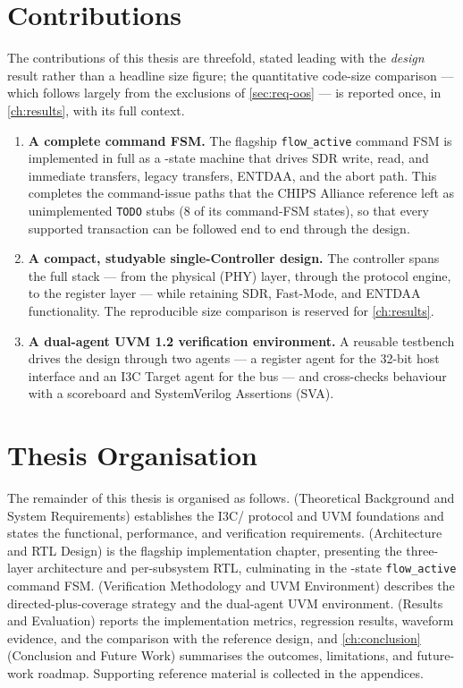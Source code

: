 \section{Contributions}
\label{sec:intro-contrib}

The contributions of this thesis are threefold, stated leading with the \emph{design} result rather than
a headline size figure; the quantitative code-size comparison --- which follows largely from the exclusions
of \cref{sec:req-oos} --- is reported once, in \cref{ch:results}, with its full context.

\begin{enumerate}
  \item \textbf{A complete command FSM.} The flagship \texttt{flow_active} command FSM is implemented in
  full as a \FlowStateCount-state machine that drives SDR write, read, and immediate transfers, \iic{} legacy
  transfers, ENTDAA, and the abort path. This completes the command-issue paths that the
  CHIPS Alliance reference left as unimplemented \texttt{TODO} stubs (8 of its command-FSM states), so
  that every supported transaction can be followed end to end through the design.

  \item \textbf{A compact, studyable single-Controller design.} The controller spans the full stack ---
  from the physical (PHY) layer, through the protocol engine, to the register layer --- while retaining
  SDR, \iic{} Fast-Mode, and ENTDAA functionality. The reproducible size comparison is reserved for
  \cref{ch:results}.

  \item \textbf{A dual-agent UVM 1.2 verification environment.} A reusable testbench drives the design
  through two agents --- a register agent for the 32-bit host interface and an I3C Target agent for the
  bus --- and cross-checks behaviour with a scoreboard and SystemVerilog Assertions (SVA).

\end{enumerate}

\section{Thesis Organisation}
\label{sec:intro-organisation}

The remainder of this thesis is organised as follows.  (Theoretical
Background and System Requirements) establishes the I3C/\iic{} protocol and UVM foundations and states
the functional, performance, and verification requirements.  (Architecture and
RTL Design) is the flagship implementation chapter, presenting the three-layer architecture and per-subsystem
RTL, culminating in the \FlowStateCount-state \texttt{flow_active} command FSM. 
(Verification Methodology and UVM Environment) describes the directed-plus-coverage strategy and the
dual-agent UVM environment.  (Results and Evaluation) reports the implementation metrics,
regression results, waveform evidence, and the comparison with the reference design, and
\cref{ch:conclusion} (Conclusion and Future Work) summarises the outcomes, limitations, and future-work
roadmap. Supporting reference material is collected in the appendices.
